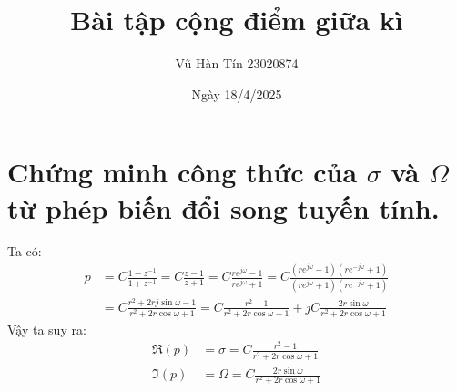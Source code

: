 \documentclass{article}
\title{Bài tập cộng điểm giữa kì
}
\author{Vũ Hàn Tín 23020874}
\date{Ngày 18/4/2025}
\begin{document}
\maketitle
\section{Chứng minh công thức của $\sigma$ và $\Omega$ từ phép biến đổi song tuyến tính.}
Ta có:
\begin{equation*}
    \begin{split}
        p&=C\frac{1-z^{-1}}{1+z^{-1}}=C\frac{z-1}{z+1}=C\frac{re^{j\omega}-1}{re^{j\omega}+1}=C\frac{(re^{j\omega}-1)(re^{-j\omega}+1)}{(re^{j\omega}+1)(re^{-j\omega}+1)}\\&=C\frac{r^{2}+2rj\sin{\omega}-1}{r^{2}+2r\cos{\omega}+1}=C\frac{r^2-1}{r^2+2r\cos{\omega}+1}+jC\frac{2r\sin{\omega}}{r^2+2r\cos{\omega}+1}
    \end{split}
\end{equation*}
Vậy ta suy ra:
\begin{equation*}
    \begin{split}
        \Re(p)&=\sigma=C\frac{r^2-1}{r^2+2r\cos{\omega}+1}\\ \Im(p)&=\Omega=C\frac{2r\sin{\omega}}{r^2+2r\cos{\omega}+1}
    \end{split}
\end{equation*}
\end{document}
